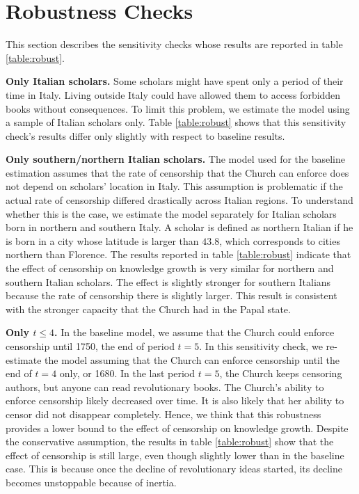 
\section{Robustness Checks}\label{appendix:c}

This section describes the sensitivity checks whose results are reported in table \ref{table:robust}.


\textbf{Only Italian scholars.} Some scholars might have spent only a period of their time in Italy. Living outside Italy could have allowed them to access forbidden books without consequences. To limit this problem, we estimate the model using a sample of Italian scholars only. Table \ref{table:robust} shows that this sensitivity check's results differ only slightly with respect to baseline results.

\textbf{Only southern/northern Italian scholars.} The model used for the baseline estimation assumes that the rate of censorship that the Church can enforce does not depend on scholars' location in Italy. This assumption is problematic if the actual rate of censorship differed drastically across Italian regions. To understand whether this is the case, we estimate the model separately for Italian scholars born in northern and southern Italy. A scholar is defined as northern Italian if he is born in a city whose latitude is larger than $43.8$, which corresponds to cities northern than Florence. The results reported in table \ref{table:robust} indicate that the effect of censorship on knowledge growth is very similar for northern and southern Italian scholars. The effect is slightly stronger for southern Italians because the rate of censorship there is slightly larger. This result is consistent with the stronger capacity that the Church had in the Papal state.

\textbf{Only $t\leq4$.} In the baseline model, we assume that the Church could enforce censorship until 1750, the end of period $t=5$. In this sensitivity check, we re-estimate the model assuming that the Church can enforce censorship until the end of $t=4$ only, or 1680. In the last period $t=5$, the Church keeps censoring authors, but anyone can read revolutionary books. The Church's ability to enforce censorship likely decreased over time. It is also likely that her ability to censor did not disappear completely. Hence, we think that this robustness provides a lower bound to the effect of censorship on knowledge growth. Despite the conservative assumption, the results in table \ref{table:robust} show that the effect of censorship is still large, even though slightly lower than in the baseline case. This is because once the decline of revolutionary ideas started, its decline becomes unstoppable because of inertia. 


